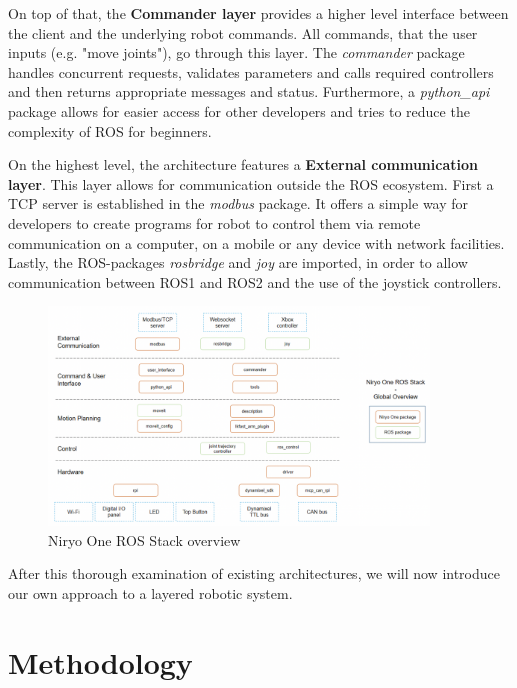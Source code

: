 \documentclass[]{article}
\begin{document}
	On top of that, the \textbf{Commander layer} provides a higher level interface between the client and the underlying robot commands. All commands, that the user inputs (e.g. "move joints"), go through this layer. The \textit{commander} package handles concurrent requests, validates parameters and calls required controllers and then returns appropriate messages and status. 
	Furthermore, a \textit{python\_api} package allows for easier access for other developers and tries to reduce the complexity of ROS for beginners. \autocite{roboticsGetStartedNiryo2024,roboticsNiryoOneROS2024}
	
	On the highest level, the architecture features a \textbf{External communication layer}.  This layer allows for communication outside the ROS ecosystem. First a TCP server is established in the \textit{modbus} package. It offers a simple way for developers to create programs for robot to control them via remote communication on a computer, on a mobile or any device with network facilities. Lastly, the ROS-packages \textit{rosbridge} and \textit{joy} are imported, in order to allow communication between ROS1 and ROS2 and the use of the joystick controllers. \autocite{roboticsGetStartedNiryo2024,roboticsNiryoOneROS2024}
	
	
	\begin{figure}[ht]
		\centering
		\includegraphics[width=0.9\textwidth]{Graphics/Niryo}
		\caption{Niryo One ROS Stack overview \autocite{roboticsNiryoOneROS2024}}
		\label{fig: fig6}
	\end{figure}
	
	After this thorough examination of existing architectures, we will now introduce our own approach to a layered robotic system. 
	
	\section{Methodology}
\end{document}
